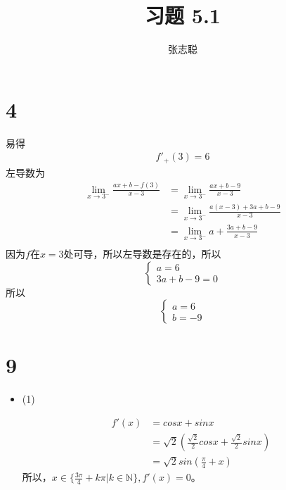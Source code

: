 \documentclass{article}
\begin{document}
\title{习题 5.1}
\author{张志聪}
\maketitle

\section*{4}

易得
\begin{align*}
  f'_+(3) = 6
\end{align*}
左导数为
\begin{align*}
  \lim\limits_{x \to 3^-} \frac{ax + b - f(3)}{x - 3}
   & = \lim\limits_{x \to 3^-} \frac{ax + b - 9}{x - 3}            \\
   & = \lim\limits_{x \to 3^-} \frac{a(x - 3) + 3a + b - 9}{x - 3} \\
   & = \lim\limits_{x \to 3^-} a + \frac{3a + b - 9}{x - 3}        \\
\end{align*}
因为$f$在$x=3$处可导，所以左导数是存在的，所以
\begin{equation*}
  \begin{cases}
    a = 6 \\
    3a + b - 9 = 0
  \end{cases}
\end{equation*}
所以
\begin{equation*}
  \begin{cases*}
    a = 6 \\
    b = -9
  \end{cases*}
\end{equation*}

\section*{9}

\begin{itemize}
  \item (1)

        \begin{align*}
          f'(x) & = cos x + sin x                                                  \\
                & = \sqrt{2} (\frac{\sqrt{2}}{2} cos x + \frac{\sqrt{2}}{2} sin x) \\
                & = \sqrt{2} sin (\frac{\pi}{4} + x)
        \end{align*}
        所以，$x \in \{\frac{3\pi}{4} + k\pi | k \in \mathbb{N} \}, f'(x) = 0$。
\end{itemize}
\end{document}

